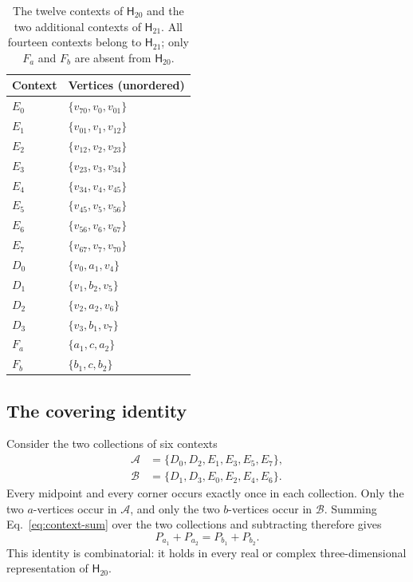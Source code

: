 \documentclass[twocolumn,aps,pra,floatfix,amsmath,amssymb,longbibliography]{revtex4-2}
\theoremstyle{definition}
\theoremstyle{remark}
\newcommand{\Htwenty}{\mathsf H_{20}}
\newcommand{\Htwentyone}{\mathsf H_{21}}
\begin{document}
\begin{table}[tb]
\caption{The twelve contexts of $\Htwenty$ and the two additional
contexts of $\Htwentyone$.  All fourteen contexts belong to $\Htwentyone$;
only $F_a$ and $F_b$ are absent from $\Htwenty$.}
\label{tab:contexts}
\centering
\begin{tabular}{@{}ll@{}}
\toprule
Context & Vertices (unordered) \\
\midrule
$E_0$ & $\{v_{70},v_0,v_{01}\}$ \\
$E_1$ & $\{v_{01},v_1,v_{12}\}$ \\
$E_2$ & $\{v_{12},v_2,v_{23}\}$ \\
$E_3$ & $\{v_{23},v_3,v_{34}\}$ \\
$E_4$ & $\{v_{34},v_4,v_{45}\}$ \\
$E_5$ & $\{v_{45},v_5,v_{56}\}$ \\
$E_6$ & $\{v_{56},v_6,v_{67}\}$ \\
$E_7$ & $\{v_{67},v_7,v_{70}\}$ \\
\midrule
$D_0$ & $\{v_0,a_1,v_4\}$ \\
$D_1$ & $\{v_1,b_2,v_5\}$ \\
$D_2$ & $\{v_2,a_2,v_6\}$ \\
$D_3$ & $\{v_3,b_1,v_7\}$ \\
\midrule
$F_a$ & $\{a_1,c,a_2\}$ \\
$F_b$ & $\{b_1,c,b_2\}$ \\
\bottomrule
\end{tabular}
\end{table}

\subsection{The covering identity}

Consider the two collections of six contexts
\begin{align*}
 \mathcal A&=\{D_0,D_2,E_1,E_3,E_5,E_7\},\\
 \mathcal B&=\{D_1,D_3,E_0,E_2,E_4,E_6\}.
\end{align*}
Every midpoint and every corner occurs exactly once in each collection.
Only the two $a$-vertices occur in $\mathcal A$, and only the two
$b$-vertices occur in $\mathcal B$.  Summing Eq.~\eqref{eq:context-sum}
over the two collections and subtracting therefore gives
\begin{equation}
 P_{a_1}+P_{a_2}=P_{b_1}+P_{b_2}.
 \label{eq:covering-identity}
\end{equation}
This identity is combinatorial: it holds in every real or complex
three-dimensional representation of $\Htwenty$.
\end{document}
